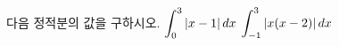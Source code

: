 다음 정적분의 값을 구하시오.
 $\displaystyle\int_{0}^{3}|x-1|\mkern3mu dx$
 $\displaystyle\int_{-1}^{3}|x(x-2)|\mkern3mu dx$
